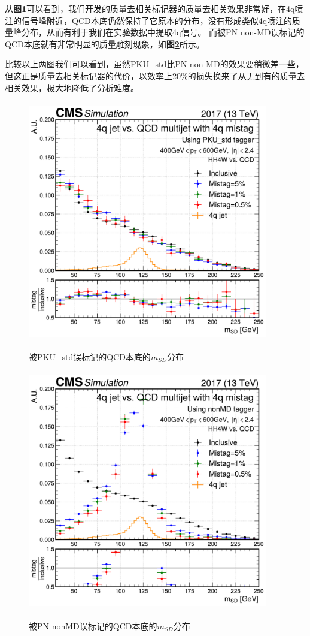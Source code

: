 从\textbf{图\ref{fig:5.3}}可以看到，我们开发的质量去相关标记器的质量去相关效果非常好，在4q喷注的信号峰附近，QCD本底仍然保持了它原本的分布，没有形成类似4q喷注的质量峰分布，从而有利于我们在实验数据中提取4q信号。
而被PN non-MD误标记的QCD本底就有非常明显的质量雕刻现象，如\textbf{图\ref{fig:5.4}}所示。

比较以上两图我们可以看到，虽然PKU\_std比PN non-MD的效果要稍微差一些，但这正是质量去相关标记器的代价，以效率上20\%的损失换来了从无到有的质量去相关效果，极大地降低了分析难度。
\begin{figure}[H]
 \centering
 \caption{被PKU\_std误标记的QCD本底的$m_{SD}$分布}
 \includegraphics[height=10.5cm, width=10.5cm]{pictures/MD_PKU_std_4q.pdf}
 \label{fig:5.3}
\end{figure}

\begin{figure}[H]
 \centering
 \caption{被PN nonMD误标记的QCD本底的$m_{SD}$分布}
 \includegraphics[height=10.5cm, width=10.5cm]{pictures/MD_nonMD_4q.pdf}
 \label{fig:5.4}
\end{figure}

